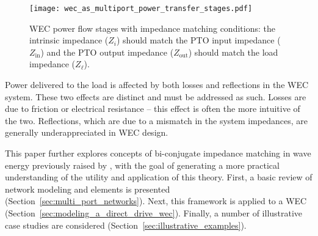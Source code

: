 \documentclass[5p,times]{elsarticle}
\begin{document}
\begin{figure}[tb]
        \centering
        \texttt{[image: wec\_as\_multiport\_power\_transfer\_stages.pdf]}
        \caption{WEC power flow stages with impedance matching conditions: the intrinsic impedance ($Z_i$) should match the PTO input impedance ($Z_{\textrm{in}}$) and the PTO output impedance ($Z_{\textrm{out}}$) should match the load impedance ($Z_\ell$).}
        \label{fig:wec_as_multiport_power_transfer_stages}
\end{figure}

Power delivered to the load is affected by both losses and reflections in the WEC system.
These two effects are distinct and must be addressed as such.
Losses are due to friction or electrical resistance -- this effect is often the more intuitive of the two.
Reflections, which are due to a mismatch in the system impedances, are generally underappreciated in WEC design.

This paper further explores concepts of bi-conjugate impedance matching in wave energy previously raised by \cite{Bacelli:2021aa}, with the goal of generating a more practical understanding of the utility and application of this theory. 
First, a basic review of network modeling and elements is presented (Section~\ref{sec:multi_port_networks}).
Next, this framework is applied to a WEC (Section~\ref{sec:modeling_a_direct_drive_wec}).
Finally, a number of illustrative case studies are considered (Section~\ref{sec:illustrative_examples}).

\end{document}
